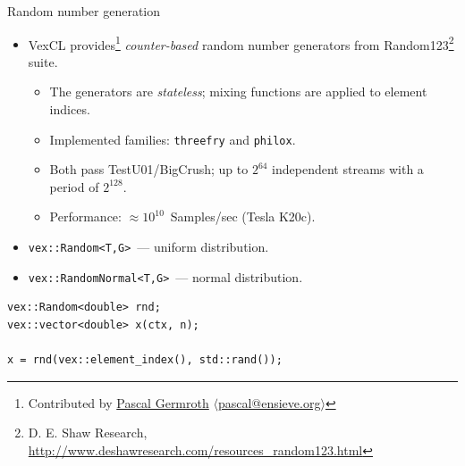 \documentclass[@BEAMER_OPTIONS@]{beamer}
\newcommand{\code}[1]{\lstinline|#1|}
\begin{document}
\begin{frame}[fragile]{Random number generation}
    \begin{itemize}
        \item VexCL provides\footnote{Contributed by
            \href{https://github.com/neapel}{Pascal Germroth}
            $\langle$\href{mailto:pascal@ensieve.org}{pascal@ensieve.org}$\rangle$}
            \emph{counter-based} random number generators from
            Random123\footnote{D. E. Shaw Research,
                \href{http://www.deshawresearch.com/resources\_random123.html}{http://www.deshawresearch.com/resources\_random123.html}}
            suite.
            \vspace{-0.5\baselineskip}
            \begin{itemize}
                \item The generators are \emph{stateless}; mixing functions are
                    applied to element indices.
                \item Implemented families: \code{threefry} and \code{philox}.
                \item Both pass TestU01/BigCrush; up to \alert{$2^{64}$}
                    independent streams with a period of \alert{$2^{128}$}.
                \item Performance: \alert{$\approx 10^{10}$}~Samples/sec (Tesla
                    K20c).
            \end{itemize}
        \item \code{vex::Random<T,G>}~--- uniform distribution.
        \item \code{vex::RandomNormal<T,G>}~--- normal distribution.
    \end{itemize}
    \begin{exampleblock}{}
        \begin{lstlisting}
vex::Random<double> rnd;
vex::vector<double> x(ctx, n);

x = rnd(vex::element_index(), std::rand());
        \end{lstlisting}
    \end{exampleblock}
\end{frame}

\end{document}
